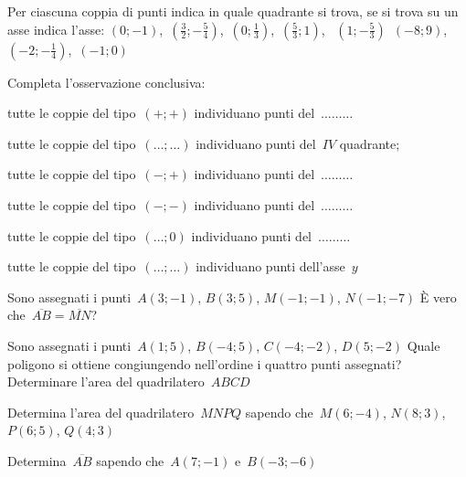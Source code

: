 \begin{esercizio}
Per ciascuna coppia di punti indica in quale quadrante si trova, se si trova 
su un asse indica l'asse:
\((0;-1)\), \,\(\left(\frac{3}{2};-\frac{5}{4}\right)\), 
\,\(\left(0;\frac{1}{3}\right)\), \,\(\left(\frac{5}{3};1\right)\), \,
\(\left(1;-\frac{5}{3}\right)\) \,\((-8;9)\), 
\,\(\left(-2;-\frac{1}{4}\right)\), \,\((-1;0)\)

Completa l'osservazione conclusiva:
\begin{itemize*}
\item tutte le coppie del tipo~\((+;+)\) individuano punti del~\(\ldots \ldots 
\ldots\)
\item tutte le coppie del tipo~\((\ldots;\ldots)\) individuano punti 
del~\(IV\) quadrante;
\item tutte le coppie del tipo~\((-;+)\) individuano punti del~\(\ldots \ldots 
\ldots\)
\item tutte le coppie del tipo~\((-;-)\) individuano punti del~\(\ldots \ldots 
\ldots\)
\item tutte le coppie del tipo~\((\ldots;0)\) individuano punti del~\(\ldots 
\ldots \ldots\)
\item tutte le coppie del tipo~\((\ldots;\ldots)\) individuano punti 
dell'asse~\(y\)
\end{itemize*}
\end{esercizio}

\begin{esercizio}
Sono assegnati i punti~\(A(3;-1)\), \(B(3;5)\), \(M(-1;-1)\), \(N(-1;-7)\) È 
vero che~\(\overline{AB}=\overline{MN}\)?
\end{esercizio}

\begin{esercizio}
Sono assegnati i punti~\(A(1;5)\), \(B(-4;5)\), \(C(-4;-2)\), \(D(5;-2)\) 
Quale poligono si ottiene congiungendo nell'ordine i quattro
punti assegnati? Determinare l'area del quadrilatero~\(ABCD\)
\end{esercizio}

\begin{esercizio}
Determina l'area del quadrilatero~\(MNPQ\) sapendo che~\(M(6;-4)\), 
\(N(8;3)\), \(P(6;5)\), \(Q(4;3)\)
\end{esercizio}

\begin{esercizio}
Determina~\(\overline{AB}\) sapendo che~\(A(7;-1)\) e~\(B(-3;-6)\)
\end{esercizio}

